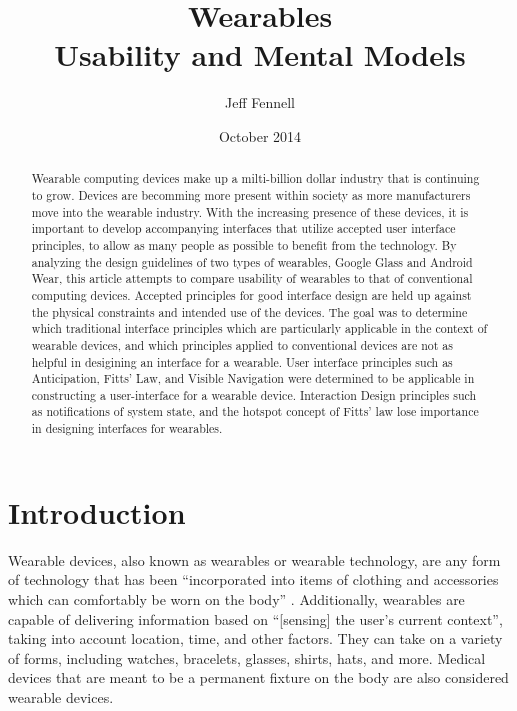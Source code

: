 \documentclass[12pt]{article}
\begin{document}
\title{Wearables \\ \vspace{2 mm} {\large Usability and Mental Models}}
\author{Jeff Fennell}
\date{October 2014}
\maketitle

\begin{abstract}
Wearable computing devices make up a milti-billion dollar industry that is continuing to grow. Devices are becomming more present within society as more manufacturers move into the wearable industry. With the increasing presence of these devices, it is important to develop accompanying interfaces that utilize accepted user interface principles, to allow as many people as possible to benefit from the technology. By analyzing the design guidelines of two types of wearables, Google Glass and Android Wear, this article attempts to compare usability of wearables to that of conventional computing devices. Accepted principles for good interface design are held up against the physical constraints and intended use of the devices. The goal was to determine which traditional interface principles which are particularly applicable in the context of wearable devices, and which principles applied to conventional devices are not as helpful in desigining an interface for a wearable. User interface principles such as Anticipation, Fitts' Law, and Visible Navigation were determined to be applicable in constructing a user-interface for a wearable device. Interaction Design principles such as notifications of system state, and the hotspot concept of Fitts' law lose importance in designing interfaces for wearables.

\end{abstract}

\tableofcontents

\section{Introduction}
Wearable devices, also known as wearables or wearable technology, are any form of technology that has been ``incorporated into items of clothing and accessories which can comfortably be worn on the body'' \cite{wd}. Additionally, wearables are capable of delivering information based on ``[sensing] the user's current context'', taking into account location, time, and other factors\cite{star}. They can take on a variety of forms, including watches, bracelets, glasses, shirts, hats, and more. Medical devices that are meant to be a permanent fixture on the body are also considered wearable devices.
\end{document}
